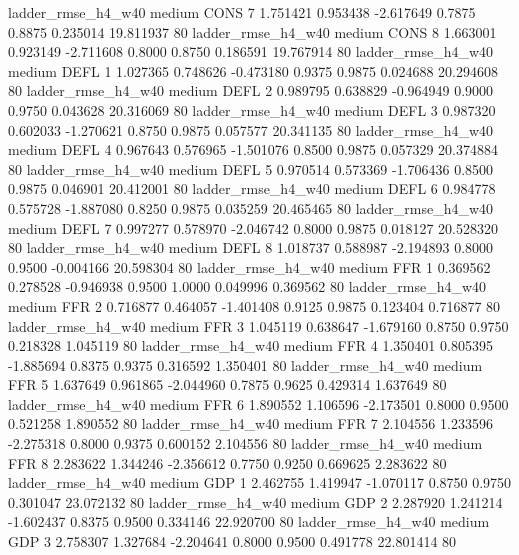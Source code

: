     ladder_rmse_h4_w40     medium     CONS                 7  1.751421 0.953438 -2.617649 0.7875 0.8875  0.235014   19.811937 80
    ladder_rmse_h4_w40     medium     CONS                 8  1.663001 0.923149 -2.711608 0.8000 0.8750  0.186591   19.767914 80
    ladder_rmse_h4_w40     medium     DEFL                 1  1.027365 0.748626 -0.473180 0.9375 0.9875  0.024688   20.294608 80
    ladder_rmse_h4_w40     medium     DEFL                 2  0.989795 0.638829 -0.964949 0.9000 0.9750  0.043628   20.316069 80
    ladder_rmse_h4_w40     medium     DEFL                 3  0.987320 0.602033 -1.270621 0.8750 0.9875  0.057577   20.341135 80
    ladder_rmse_h4_w40     medium     DEFL                 4  0.967643 0.576965 -1.501076 0.8500 0.9875  0.057329   20.374884 80
    ladder_rmse_h4_w40     medium     DEFL                 5  0.970514 0.573369 -1.706436 0.8500 0.9875  0.046901   20.412001 80
    ladder_rmse_h4_w40     medium     DEFL                 6  0.984778 0.575728 -1.887080 0.8250 0.9875  0.035259   20.465465 80
    ladder_rmse_h4_w40     medium     DEFL                 7  0.997277 0.578970 -2.046742 0.8000 0.9875  0.018127   20.528320 80
    ladder_rmse_h4_w40     medium     DEFL                 8  1.018737 0.588987 -2.194893 0.8000 0.9500 -0.004166   20.598304 80
    ladder_rmse_h4_w40     medium      FFR                 1  0.369562 0.278528 -0.946938 0.9500 1.0000  0.049996    0.369562 80
    ladder_rmse_h4_w40     medium      FFR                 2  0.716877 0.464057 -1.401408 0.9125 0.9875  0.123404    0.716877 80
    ladder_rmse_h4_w40     medium      FFR                 3  1.045119 0.638647 -1.679160 0.8750 0.9750  0.218328    1.045119 80
    ladder_rmse_h4_w40     medium      FFR                 4  1.350401 0.805395 -1.885694 0.8375 0.9375  0.316592    1.350401 80
    ladder_rmse_h4_w40     medium      FFR                 5  1.637649 0.961865 -2.044960 0.7875 0.9625  0.429314    1.637649 80
    ladder_rmse_h4_w40     medium      FFR                 6  1.890552 1.106596 -2.173501 0.8000 0.9500  0.521258    1.890552 80
    ladder_rmse_h4_w40     medium      FFR                 7  2.104556 1.233596 -2.275318 0.8000 0.9375  0.600152    2.104556 80
    ladder_rmse_h4_w40     medium      FFR                 8  2.283622 1.344246 -2.356612 0.7750 0.9250  0.669625    2.283622 80
    ladder_rmse_h4_w40     medium      GDP                 1  2.462755 1.419947 -1.070117 0.8750 0.9750  0.301047   23.072132 80
    ladder_rmse_h4_w40     medium      GDP                 2  2.287920 1.241214 -1.602437 0.8375 0.9500  0.334146   22.920700 80
    ladder_rmse_h4_w40     medium      GDP                 3  2.758307 1.327684 -2.204641 0.8000 0.9500  0.491778   22.801414 80
